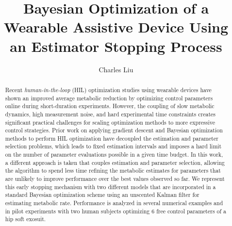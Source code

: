 \documentclass[11pt]{gsasthesis} %
\title{Bayesian Optimization of a Wearable Assistive Device Using an Estimator Stopping Process} %
\author{Charles Liu} %
\begin{document}


\thesistitlepage
\copyrightpage
\begin{abstract}
  Recent \emph{human-in-the-loop} (HIL) optimization studies using wearable devices have shown an improved average metabolic reduction by optimizing control parameters online during short-duration experiments. However, the coupling of slow metabolic dynamics, high measurement noise, and hard experimental time constraints creates significant practical challenges for scaling optimization methods to more expressive control strategies. Prior work on applying gradient descent and Bayesian optimization methods to perform HIL optimization have decoupled the estimation and parameter selection problems, which leads to fixed estimation intervals and imposes a hard limit on the number of parameter evaluations possible in a given time budget. In this work, a different approach is taken that couples estimation and parameter selection, allowing the algorithm to spend less time refining the metabolic estimates for parameters that are unlikely to improve performance over the best values observed so far. We represent this early stopping mechanism with two different models that are incorporated in a standard Bayesian optimization scheme using an unscented Kalman filter for estimating metabolic rate. Performance is analyzed in several numerical examples and in pilot experiments with two human subjects optimizing 6 free control parameters of a hip soft exosuit.
\end{abstract}

\renewcommand{\contentsname}{\protect\centering\protect\Large Contents}
\renewcommand{\listtablename}{\protect\centering\protect\Large List of Tables}
\renewcommand{\listfigurename}{\protect\centering\protect\Large List of Figures}
\renewcommand{\listalgorithmname}{\protect\centering\protect\Large List of Algorithms}

\tableofcontents %
\end{document}
